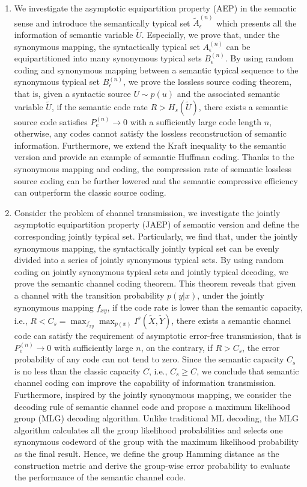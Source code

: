 \documentclass[12pt, draftclsnofoot,onecolumn]{IEEEtran}
\begin{document}
\begin{enumerate}[(1)]
  \item We investigate the asymptotic equipartition property (AEP) in the semantic sense and introduce the semantically typical set $\tilde{A}_{\epsilon}^{(n)}$ which presents all the information of semantic variable $\tilde{U}$. Especially, we prove that, under the synonymous mapping, the syntactically typical set $A_{\epsilon}^{(n)}$ can be equipartitioned into many synonymous typical sets $B_{\epsilon}^{(n)}$. By using random coding and synonymous mapping between a semantic typical sequence to the synonymous typical set $B_{\epsilon}^{(n)}$, we prove the lossless source coding theorem, that is, given a syntactic source $U\sim p(u)$ and the associated semantic variable $\tilde{U}$, if the semantic code rate $R>H_s(\tilde{U})$, there exists a semantic source code satisfies $P_e^{(n)}\to 0$ with a sufficiently large code length $n$, otherwise, any codes cannot satisfy the lossless reconstruction of semantic information. Furthermore, we extend the Kraft inequality to the semantic version and provide an example of semantic Huffman coding. Thanks to the synonymous mapping and coding, the compression rate of semantic lossless source coding can be further lowered and the semantic compressive efficiency can outperform the classic source coding.

  \item Consider the problem of channel transmission, we investigate the jointly asymptotic equipartition property (JAEP) of semantic version and define the corresponding jointly typical set. Particularly, we find that, under the jointly synonymous mapping, the syntactically jointly typical set can be evenly divided into a series of jointly synonymous typical sets. By using random coding on jointly synonymous typical sets and jointly typical decoding, we prove the semantic channel coding theorem. This theorem reveals that given a channel with the transition probability $p(y|x)$, under the jointly synonymous mapping $f_{xy}$, if the code rate is lower than the semantic capacity, i.e., $R<C_s=\max_{f_{xy}}\max_{p(x)} I^s(\tilde{X},\tilde{Y})$, there exists a semantic channel code can satisfy the requirement of asymptotic error-free transmission, that is $P_e^{(n)}\to 0$ with sufficiently large $n$, on the contrary, if $R>C_s$, the error probability of any code can not tend to zero. Since the semantic capacity $C_s$ is no less than the classic capacity $C$, i.e., $C_s\geq C$, we conclude that semantic channel coding can improve the capability of information transmission. Furthermore, inspired by the jointly synonymous mapping, we consider the decoding rule of semantic channel code and propose a maximum likelihood group (MLG) decoding algorithm. Unlike traditional ML decoding, the MLG algorithm calculates all the group likelihood probabilities and selects one synonymous codeword of the group with the maximum likelihood probability as the final result. Hence, we define the group Hamming distance as the construction metric and derive the group-wise error probability to evaluate the performance of the semantic channel code.


\end{enumerate}
\end{document}
